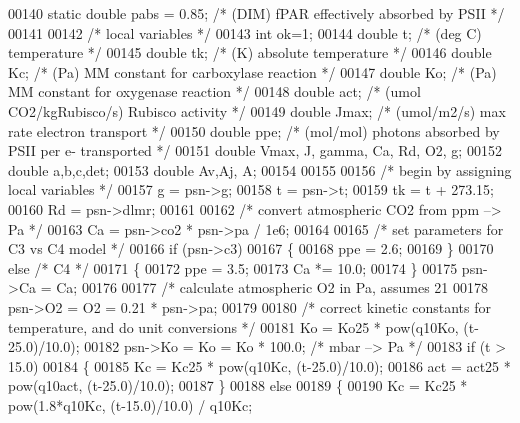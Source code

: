 \begin{DoxyCode}
00140     \textcolor{keyword}{static} \textcolor{keywordtype}{double} pabs = 0.85;    \textcolor{comment}{/* (DIM) fPAR effectively absorbed by PSII */}
00141     
00142     \textcolor{comment}{/* local variables */}
00143     \textcolor{keywordtype}{int} ok=1;   
00144     \textcolor{keywordtype}{double} t;      \textcolor{comment}{/* (deg C) temperature */}
00145     \textcolor{keywordtype}{double} tk;     \textcolor{comment}{/* (K) absolute temperature */}
00146     \textcolor{keywordtype}{double} Kc;     \textcolor{comment}{/* (Pa) MM constant for carboxylase reaction */}
00147     \textcolor{keywordtype}{double} Ko;     \textcolor{comment}{/* (Pa) MM constant for oxygenase reaction */}
00148     \textcolor{keywordtype}{double} act;    \textcolor{comment}{/* (umol CO2/kgRubisco/s) Rubisco activity */}
00149     \textcolor{keywordtype}{double} Jmax;   \textcolor{comment}{/* (umol/m2/s) max rate electron transport */}
00150     \textcolor{keywordtype}{double} ppe;    \textcolor{comment}{/* (mol/mol) photons absorbed by PSII per e- transported */}
00151     \textcolor{keywordtype}{double} Vmax, J, gamma, Ca, Rd, O2, g;
00152     \textcolor{keywordtype}{double} a,b,c,det;
00153     \textcolor{keywordtype}{double} Av,Aj, A;
00154 
00155     
00156     \textcolor{comment}{/* begin by assigning local variables */}
00157     g = psn->g;
00158     t = psn->t;
00159     tk = t + 273.15;
00160     Rd = psn->dlmr;
00161     
00162     \textcolor{comment}{/* convert atmospheric CO2 from ppm --> Pa */}
00163     Ca = psn->co2 * psn->pa / 1e6;
00164     
00165     \textcolor{comment}{/* set parameters for C3 vs C4 model */}
00166     \textcolor{keywordflow}{if} (psn->c3)
00167     \{
00168         ppe = 2.6;
00169     \}
00170     \textcolor{keywordflow}{else} \textcolor{comment}{/* C4 */}
00171     \{
00172         ppe = 3.5;
00173         Ca *= 10.0;
00174     \}
00175     psn->Ca = Ca;       
00176     
00177     \textcolor{comment}{/* calculate atmospheric O2 in Pa, assumes 21%
00178     psn->O2 = O2 = 0.21 * psn->pa;
00179     
00180     \textcolor{comment}{/* correct kinetic constants for temperature, and do unit conversions */}
00181     Ko = Ko25 * pow(q10Ko, (t-25.0)/10.0);
00182     psn->Ko = Ko = Ko * 100.0;   \textcolor{comment}{/* mbar --> Pa */}
00183     \textcolor{keywordflow}{if} (t > 15.0)
00184     \{
00185         Kc = Kc25 * pow(q10Kc, (t-25.0)/10.0);
00186         act = act25 * pow(q10act, (t-25.0)/10.0);
00187     \}
00188     \textcolor{keywordflow}{else}
00189     \{
00190         Kc = Kc25 * pow(1.8*q10Kc, (t-15.0)/10.0) / q10Kc;
}
\end{DoxyCode}

